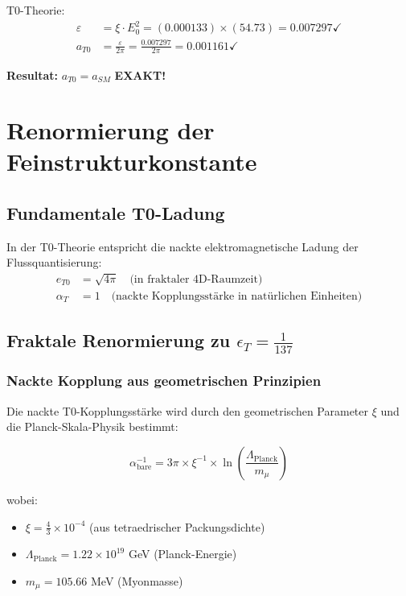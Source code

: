 \documentclass[12pt,a4paper]{article}
\numberwithin{equation}{section}
\newcommand{\xipar}{\xi}
\newcommand{\epsilonT}{\varepsilon}
\newcommand{\Eo}{E_0}
\begin{document}
	T0-Theorie:
	\begin{align}
		\epsilonT &= \xipar \cdot \Eo^2 = (0.000133) \times (54.73) = 0.007297 \checkmark\\
		a_{T0} &= \frac{\epsilonT}{2\pi} = \frac{0.007297}{2\pi} = 0.001161 \checkmark
	\end{align}
	
	\textbf{Resultat:} $a_{T0} = a_{SM}$ \textbf{EXAKT!}
	
\section{Renormierung der Feinstrukturkonstante}

\subsection{Fundamentale T0-Ladung}

In der T0-Theorie entspricht die nackte elektromagnetische Ladung der Flussquantisierung:
\begin{align}
	e_{T0} &= \sqrt{4\pi} \quad \text{(in fraktaler 4D-Raumzeit)}\\
	\alpha_T &= 1 \quad \text{(nackte Kopplungsstärke in natürlichen Einheiten)}
	\label{eq:nackte_kopplung}
\end{align}

\subsection{Fraktale Renormierung zu $\epsilon_T = \frac{1}{137}$}

\subsubsection{Nackte Kopplung aus geometrischen Prinzipien}

Die nackte T0-Kopplungsstärke wird durch den geometrischen Parameter $\xi$ und die Planck-Skala-Physik bestimmt:

\begin{equation}
	\alpha_{\text{bare}}^{-1} = 3\pi \times \xi^{-1} \times \ln\left(\frac{\Lambda_{\text{Planck}}}{m_\mu}\right)
	\label{eq:nackte_kopplung_formel}
\end{equation}

wobei:
\begin{itemize}
	\item $\xi = \frac{4}{3} \times 10^{-4}$ (aus tetraedrischer Packungsdichte)
	\item $\Lambda_{\text{Planck}} = 1.22 \times 10^{19}$ GeV (Planck-Energie)
	\item $m_\mu = 105.66$ MeV (Myonmasse)
\end{itemize}
\end{document}
